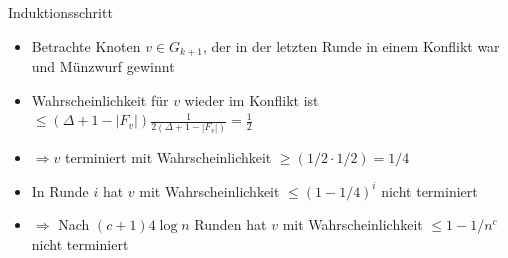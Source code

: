 \documentclass[18pt]{beamer}
\begin{document}
\begin{frame}{Induktionsschritt}
		\begin{itemize}[<+->]
			\item Betrachte Knoten $v \in G_{k+1}$, der in der letzten Runde in einem Konflikt war und Münzwurf gewinnt
			\item Wahrscheinlichkeit für $v$ wieder im Konflikt ist $\leq (\Delta + 1  - |F_v|) \frac{1}{2 (\Delta + 1 - |F_v|)} = \frac{1}{2}$
			\item $\Rightarrow v$ terminiert mit Wahrscheinlichkeit $\geq (1/2 \cdot 1/2) = 1/4$
			\item In Runde $i$ hat $v$ mit Wahrscheinlichkeit $\leq (1-1/4)^i$ nicht terminiert
			\item $\Rightarrow$ Nach $(c+1) 4\log n$ Runden hat $v$ mit Wahrscheinlichkeit $\leq 1-1/n^c$ nicht terminiert
		\end{itemize}
\end{frame}
\end{document}

